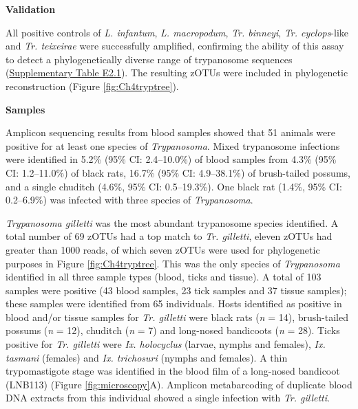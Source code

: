 \documentclass[a4paper, nobind]{templates/ociamthesis}
\begin{document}
\textbf{Validation}

All positive controls of \emph{L. infantum}, \emph{L. macropodum}, \emph{Tr. binneyi}, \emph{Tr. cyclops}-like and \emph{Tr. teixeirae} were successfully amplified, confirming the ability of this assay to detect a phylogenetically diverse range of trypanosome sequences (\protect\hyperlink{supplementary-table-e2.1}{Supplementary Table E2.1}). The resulting zOTUs were included in phylogenetic reconstruction (Figure \ref{fig:Ch4tryptree}).

\textbf{Samples}

Amplicon sequencing results from blood samples showed that 51 animals were positive for at least one species of \emph{Trypanosoma}.
Mixed trypanosome infections were identified in 5.2\% (95\% CI: 2.4--10.0\%) of blood samples from 4.3\% (95\% CI: 1.2--11.0\%) of black rats, 16.7\% (95\% CI: 4.9--38.1\%) of brush-tailed possums, and a single chuditch (4.6\%, 95\% CI: 0.5--19.3\%).
One black rat (1.4\%, 95\% CI: 0.2--6.9\%) was infected with three species of \emph{Trypanosoma}.

\emph{Trypanosoma gilletti} was the most abundant trypanosome species identified.
A total number of 69 zOTUs had a top match to \emph{Tr. gilletti}, eleven zOTUs had greater than 1000 reads, of which seven zOTUs were used for phylogenetic purposes in Figure \ref{fig:Ch4tryptree}.
This was the only species of \emph{Trypanosoma} identified in all three sample types (blood, ticks and tissue).
A total of 103 samples were positive (43 blood samples, 23 tick samples and 37 tissue samples); these samples were identified from 65 individuals.
Hosts identified as positive in blood and/or tissue samples for \emph{Tr. gilletti} were black rats (\emph{n} = 14), brush-tailed possums (\emph{n} = 12), chuditch (\emph{n} = 7) and long-nosed bandicoots (\emph{n} = 28).
Ticks positive for \emph{Tr. gilletti} were \emph{Ix. holocyclus} (larvae, nymphs and females), \emph{Ix. tasmani} (females) and \emph{Ix. trichosuri} (nymphs and females).
A thin trypomastigote stage was identified in the blood film of a long-nosed bandicoot (LNB113) (Figure \ref{fig:microscopy}A).
Amplicon metabarcoding of duplicate blood DNA extracts from this individual showed a single infection with \emph{Tr. gilletti}.
\end{document}
